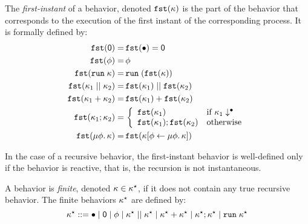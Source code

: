 \documentclass[9pt,preprint]{sigplanconf}
\newcommand{\todo}[1]{ {\color{red} #1}}
\newcommand{\sdeq}{::=}
\begin{document}
\begin{definition}
The \emph{first-instant} of a behavior, denoted $\mathtt{fst}(\kappa)$ is the part of the behavior that corresponds to the execution of the first instant of the corresponding process. It is formally defined by:
\begin{align*}
\mathtt{fst}(\textsf{0}) =&\, \mathtt{fst}(\bullet)  = \textsf{0} \\
\mathtt{fst}(\phi) =&\, \phi \\
\mathtt{fst}(\mathtt{run}\; \kappa) =&\, \mathtt{run}\; (\mathtt{fst}(\kappa)) \\ 
\mathtt{fst}(\kappa_1 \mid\mid \kappa_2) =&\, \mathtt{fst}(\kappa_1) \mid\mid \mathtt{fst}(\kappa_2) \\
\mathtt{fst}(\kappa_1 + \kappa_2) =&\, \mathtt{fst}(\kappa_1) + \mathtt{fst}(\kappa_2) \\
\mathtt{fst}(\kappa_1 ; \kappa_2) =&\, 
		\left\{ \begin{array}{ll}  
				\mathtt{fst}(\kappa_1) & \text{if } \kappa_1\downarrow^{\bullet} \\
				\mathtt{fst}(\kappa_1) ; \mathtt{fst}(\kappa_2) &\text{otherwise} 
		\end{array}\right. \\
\mathtt{fst}(\mu \phi.\, \kappa) =&\, \mathtt{fst}(\kappa[\phi \leftarrow \mu \phi.\, \kappa])
\end{align*}
\end{definition}
In the case of a recursive behavior,  the first-instant behavior is well-defined only if the behavior is reactive, that is, the recursion is not instantaneous.

\begin{definition}
A behavior is \emph{finite}, denoted $\kappa \in \kappa^{\star}$, if it does not contain any true recursive behavior. The finite behaviors $\kappa^{\star}$ are defined by: 
\[
\rkf \sdeq \effplus \mid \effmin \mid \effvar \mid \effpar{\rkf}{\rkf} \mid \effor{\rkf}{\rkf}
\mid \effcon{\rkf}{\rkf}  \mid \effrun{\rkf}
\]
\end{definition}
\end{document}
